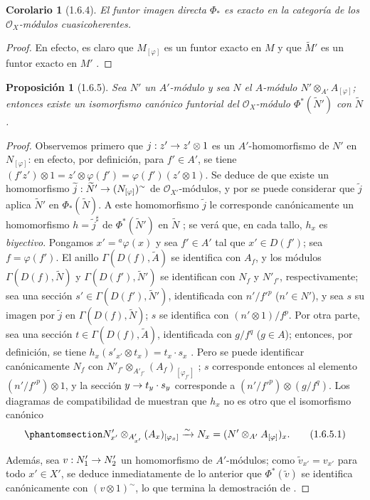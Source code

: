 \documentclass[oneside]{amsart}
\theoremstyle{ega-env-style}
\theoremstyle{ega-thm-env-style}
\newtheorem*{proposition}{Proposición}
\newtheorem*{corollary}{Corolario}
\theoremstyle{ega-defn-env-style}
\renewcommand{\to}{\mathchoice{\longrightarrow}{\rightarrow}{\rightarrow}{\rightarrow}}
\let\EGAOriginalLabel\label
\renewcommand{\label}[1]{\phantomsection\EGAOriginalLabel{#1}}
\begin{document}
\begin{corollary}[1.6.4]
\label{I.1.6.4}
El funtor imagen directa $\Phi_*$ es exacto en la categoría de los $\mathscr{O}_X$-módulos cuasicoherentes.
\end{corollary}

\begin{proof}
En efecto, es claro que $M_{[\varphi]}$ es un funtor exacto en $M$ y que $\widetilde{M}'$ es un
funtor exacto en $M'$ .
\end{proof}

\begin{proposition}[1.6.5]
\label{I.1.6.5}
Sea $N'$ un $A'$-módulo y sea $N$ el $A$-módulo $N'\otimes_{A'}A_{[\varphi]}$;
entonces existe un isomorfismo canónico funtorial del $\mathscr{O}_X$-módulo $\Phi^*(\widetilde{N}')$ con $\widetilde{N}$.
\end{proposition}

\begin{proof}
Observemos primero que $j:z'\to z'\otimes 1$ es un $A'$-homomorfismo de $N'$ en $N_{[\varphi]}$: en efecto, por definición, para $f'\in A'$, se tiene $(f'z')\otimes 1=z'\otimes\varphi(f')=\varphi(f')(z'\otimes 1)$.
Se deduce de  que existe un homomorfismo $\widetilde{j}:\widetilde{N}'\to(N_{[\varphi]})^{\sim}$ de $\mathscr{O}_{X'}$-módulos, y por  se puede considerar que $\widetilde{j}$ aplica $\widetilde{N}'$ en $\Phi_*(\widetilde{N})$.
A este homomorfismo $\widetilde{j}$ le corresponde canónicamente un homomorfismo $h=\widetilde{j}^{\sharp}$ de $\Phi^*(\widetilde{N}')$ en $\widetilde{N}$ ;
se verá que, en cada tallo, $h_x$ es \emph{biyectivo}.
Pongamos $x'={}^a\varphi(x)$ y sea $f'\in A'$ tal que $x'\in D(f')$;
sea $f=\varphi(f')$.
El anillo $\Gamma(D(f),\widetilde{A})$ se identifica con $A_f$, y los módulos
$\Gamma(D(f),\widetilde{N})$ y $\Gamma(D(f'),\widetilde{N}')$ se identifican con $N_f$ y $N'_{f'}$, respectivamente;
sea una sección $s'\in\Gamma(D(f'),\widetilde{N}')$, identificada con $n'/{f'}^p$ ($n'\in N'$), y sea $s$ su imagen por $\widetilde{j}$ en $\Gamma(D(f),\widetilde{N})$;
$s$ se identifica con $(n'\otimes 1)/f^p$.
Por otra parte, sea una sección $t\in\Gamma(D(f),\widetilde{A})$, identificada con $g/f^q$ ($g\in A$);
entonces, por definición, se tiene $h_x(s'_{x'}\otimes t_x)=t_x\cdot s_x$ .
Pero se puede identificar canónicamente $N_f$ con $N'_{f'}\otimes_{A'_{f'}}(A_f)_{[\varphi_{f'}]}$ ;
$s$ corresponde entonces al elemento $(n'/{f'}^p)\otimes 1$, y la sección $y\to t_y\cdot s_y$ corresponde a $(n'/{f'}^p)\otimes(g/f^q)$.
Los diagramas de compatibilidad de  muestran que $h_x$ no es otro que el isomorfismo canónico
\[
  \label{I.1.6.5.1-fr}
  N'_{x'}\otimes_{A'_{x'}}(A_x)_{[\varphi_x]}
  \xrightarrow{\sim}N_x=(N'\otimes_{A'}A_{[\varphi]})_x.
  \tag{1.6.5.1}
\]

Además, sea $v:N'_1\to N'_2$ un homomorfismo de $A'$-módulos;
como $\widetilde{v}_{x'}=v_{x'}$ para todo $x'\in X'$, se deduce inmediatamente de lo anterior que $\Phi^*(\widetilde{v})$ se identifica canónicamente con $(v\otimes 1)^{\sim}$, lo que termina la demostración de .
\end{proof}
\end{document}
